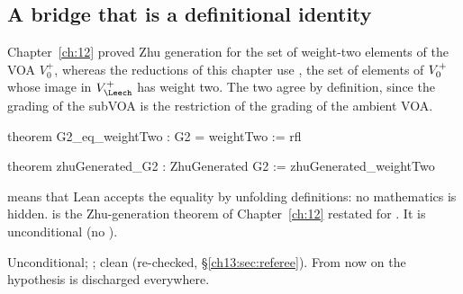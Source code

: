 \subsection{A bridge that is a definitional identity}
Chapter~\ref{ch:12} proved Zhu generation for the set  of weight-two
elements of the VOA $V_0^+$, whereas the reductions of this chapter use , the set of
elements of $V_0^{+}$ whose image in $V_\Leech^+$ has weight two. The two agree by definition, since
the grading of the subVOA is the restriction of the grading of the ambient VOA.
\begin{leancode}
theorem G2_eq_weightTwo : G2 = weightTwo := rfl

theorem zhuGenerated_G2 : ZhuGenerated G2 := zhuGenerated_weightTwo
\end{leancode}
\begin{dictionary}
 means that Lean accepts the equality by unfolding definitions: no mathematics is hidden.
 is the Zhu-generation theorem of Chapter~\ref{ch:12} restated for .
It is unconditional (no ).
\end{dictionary}
\begin{status}Unconditional; ;
 clean (re-checked, \S\ref{ch13:sec:referee}). From now on the
hypothesis  is discharged everywhere.\end{status}

